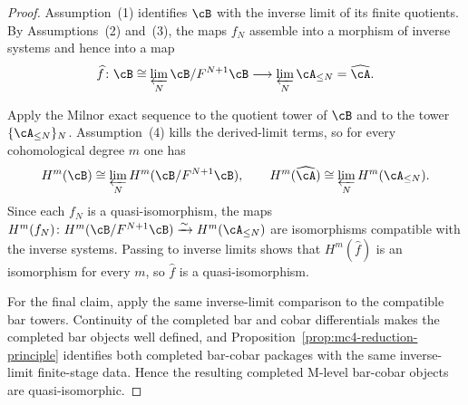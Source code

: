 \begin{proof}
Assumption~\textup{(1)} identifies $\cB$ with the inverse limit of its
finite quotients.  By Assumptions~\textup{(2)} and~\textup{(3)}, the
maps $f_N$ assemble into a morphism of inverse systems and hence into a
map
\[
\widehat f\colon
\cB \cong \varprojlim_N \cB/F^{N+1}\cB \longrightarrow
\varprojlim_N \cA_{\le N}=\widehat{\cA}.
\]

Apply the Milnor exact sequence to the quotient tower of $\cB$ and to
the tower $\{\cA_{\le N}\}_N$.  Assumption~\textup{(4)} kills the
derived-limit terms, so for every cohomological degree $m$ one has
\[
H^m(\cB)\cong \varprojlim_N H^m(\cB/F^{N+1}\cB),
\qquad
H^m(\widehat{\cA})\cong \varprojlim_N H^m(\cA_{\le N}).
\]
Since each $f_N$ is a quasi-isomorphism, the maps
$H^m(f_N)\colon H^m(\cB/F^{N+1}\cB)\xrightarrow{\sim}
H^m(\cA_{\le N})$ are isomorphisms compatible with the inverse systems.
Passing to inverse limits shows that $H^m(\widehat f)$ is an isomorphism
for every $m$, so $\widehat f$ is a quasi-isomorphism.

For the final claim, apply the same inverse-limit comparison to the
compatible bar towers.  Continuity of the completed bar and cobar
differentials makes the completed bar objects well defined, and
Proposition~\ref{prop:mc4-reduction-principle} identifies both
completed bar-cobar packages with the same inverse-limit finite-stage
data.  Hence the resulting completed M-level bar-cobar objects are
quasi-isomorphic.
\end{proof}

